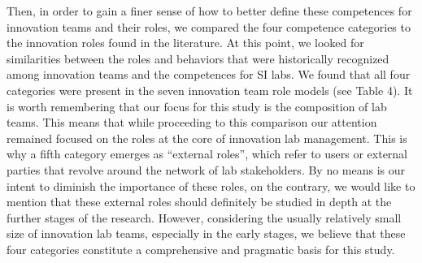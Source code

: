 \documentclass[AMA,STIX1COL,APA,STIX2COL]{WileyNJD-v2}
\begin{document}
Then, in order to gain a finer sense of how to better define these
competences for innovation teams and their roles, we compared the four
competence categories to the innovation roles found in the literature.
At this point, we looked for similarities between the roles and
behaviors that were historically recognized among innovation teams and
the competences for SI labs. We found that all four categories were
present in the seven innovation team role models (see Table 4). It is
worth remembering that our focus for this study is the composition of
lab teams. This means that while proceeding to this comparison our
attention remained focused on the roles at the core of innovation lab
management. This is why a fifth category emerges as ``external roles'',
which refer to users or external parties that revolve around the network
of lab stakeholders. By no means is our intent to diminish the
importance of these roles, on the contrary, we would like to mention
that these external roles should definitely be studied in depth at the
further stages of the research. However, considering the usually
relatively small size of innovation lab teams, especially in the early
stages, we believe that these four categories constitute a comprehensive
and pragmatic basis for this study.

\providecommand{\docline}[3]{\noalign{\global\setlength{\arrayrulewidth}{#1}}\arrayrulecolor[HTML]{#2}\cline{#3}}

\setlength{\tabcolsep}{2pt}

\renewcommand*{\arraystretch}{1.5}
\end{document}
